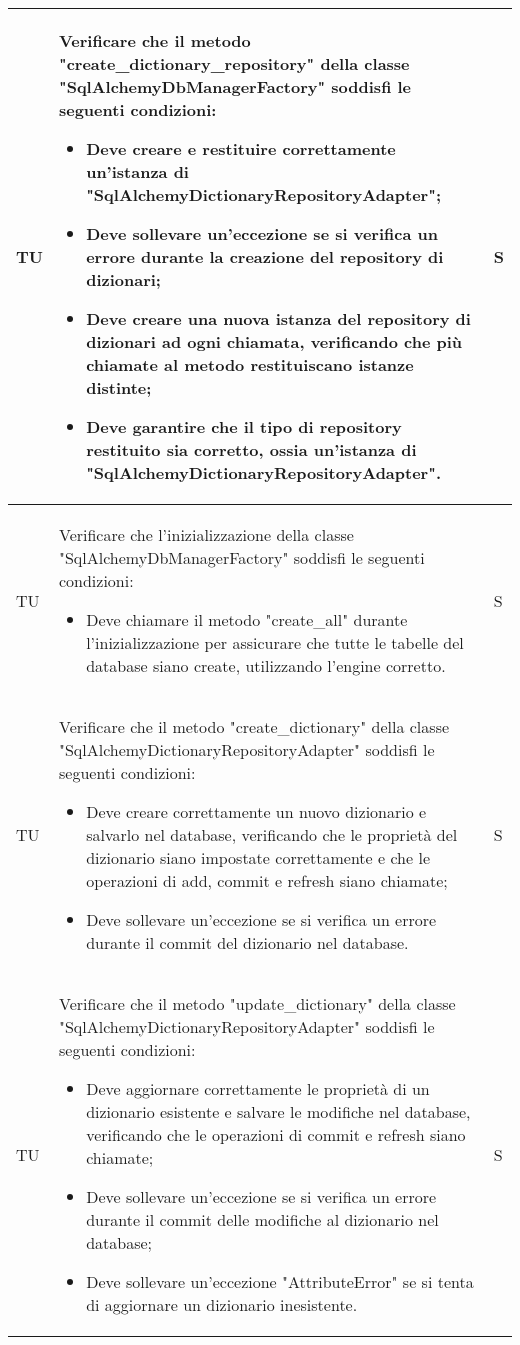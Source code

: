 \begin{adjustwidth}{-0.5cm}{-0.5cm}
\begin{longtable}{|P{1.5cm}|>{\raggedright}P{9.5cm}|>{\arraybackslash}P{1.5cm}|}
		\hline TU & Verificare che il metodo "create_dictionary_repository" della classe "SqlAlchemyDbManagerFactory" soddisfi le seguenti condizioni:
	\begin{itemize}
		\item Deve creare e restituire correttamente un'istanza di "SqlAlchemyDictionaryRepositoryAdapter";
		\item Deve sollevare un'eccezione se si verifica un errore durante la creazione del repository di dizionari;
		\item Deve creare una nuova istanza del repository di dizionari ad ogni chiamata, verificando che più chiamate al metodo restituiscano istanze distinte;
		\item Deve garantire che il tipo di repository restituito sia corretto, ossia un'istanza di "SqlAlchemyDictionaryRepositoryAdapter".
	\end{itemize} & S \\

		\hline TU & Verificare che l'inizializzazione della classe "SqlAlchemyDbManagerFactory" soddisfi le seguenti condizioni:
	\begin{itemize}
		\item Deve chiamare il metodo "create_all" durante l'inizializzazione per assicurare che tutte le tabelle del database siano create, utilizzando l'engine corretto.
	\end{itemize} & S \\
		
		\hline TU & Verificare che il metodo "create_dictionary" della classe "SqlAlchemyDictionaryRepositoryAdapter" soddisfi le seguenti condizioni:
	\begin{itemize}
		\item Deve creare correttamente un nuovo dizionario e salvarlo nel database, verificando che le proprietà del dizionario siano impostate correttamente e che le operazioni di add, commit e refresh siano chiamate;
		\item Deve sollevare un'eccezione se si verifica un errore durante il commit del dizionario nel database.
	\end{itemize} & S \\

	\hline TU & Verificare che il metodo "update_dictionary" della classe "SqlAlchemyDictionaryRepositoryAdapter" soddisfi le seguenti condizioni:
	\begin{itemize}
		\item Deve aggiornare correttamente le proprietà di un dizionario esistente e salvare le modifiche nel database, verificando che le operazioni di commit e refresh siano chiamate;
		\item Deve sollevare un'eccezione se si verifica un errore durante il commit delle modifiche al dizionario nel database;
		\item Deve sollevare un'eccezione "AttributeError" se si tenta di aggiornare un dizionario inesistente.
	\end{itemize} & S \\


\end{longtable}
\end{adjustwidth}
